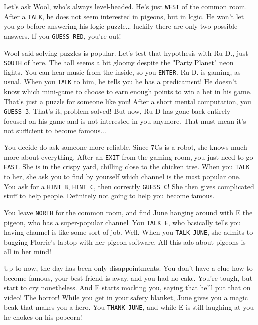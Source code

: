 \documentclass{article}
\newcommand{\bckg}[1]{\AddToShipoutPictureBG*{\texttt{[image: \#1]}}}
\begin{document}
Let's ask Wool, who's always level-headed. He's just \texttt{WEST} of the common room.
After a \texttt{TALK}, he does not seem interested in pigeons, but in logic.
He won't let you go before answering his logic puzzle... luckily there are only two possible answers.
If you \texttt{GUESS RED}, you're out!

Wool said solving puzzles is popular.
Let's test that hypothesis with Ru D., just \texttt{SOUTH} of here.
The hall seems a bit gloomy despite the "Party Planet" neon lights.
You can hear music from the inside, so you \texttt{ENTER}.
Ru D. is gaming, as usual. When you \texttt{TALK} to him, he tells you he has a predicament!
He doesn't know which mini-game to choose to earn enough points to win a bet in his game.
That's just a puzzle for someone like you!
After a short mental computation, you \texttt{GUESS 3}. That's it, problem solved!
But now, Ru D has gone back entirely focused on his game and is not interested in you anymore.
That must mean it's not sufficient to become famous...

\clearpage
{}
\bckg{img/bg}

You decide do ask someone more reliable.
Since 7Cs is a robot, she knows much more about everything.
After an \texttt{EXIT} from the gaming room, you just need to go \texttt{EAST}.
She is in the crispy yard, chilling close to the chicken tree.
When you \texttt{TALK} to her, she ask you to find by yourself which channel is the most popular one.
You ask for a \texttt{HINT B}, \texttt{HINT C}, then correctly \texttt{GUESS C}!
She then gives complicated stuff to help people.
Definitely not going to help you become famous.

You leave \texttt{NORTH} for the common room,
and find June hanging around with E the pigeon, who has a super-popular channel!
You \texttt{TALK E}, who basically tells you having channel is like some sort of job.
Well. When you \texttt{TALK JUNE}, she admits to bugging Florrie's laptop with her pigeon software.
All this ado about pigeons is all in her mind!

Up to now, the day has been only disappointments.
You don't have a clue how to become famous, your best friend is away, and you had no cake.
You're tough, but start to cry nonetheless.
And E starts mocking you, saying that he'll put that on video! The horror!
While you get in your safety blanket, June gives you a magic beak that makes you a hero.
You \texttt{THANK JUNE}, and while E is still laughing at you he chokes on his popcorn!
\end{document}
